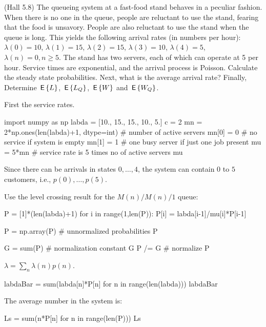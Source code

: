 \begin{exercise}
  (Hall 5.8) The queueing system at a fast-food stand behaves in a
  peculiar fashion. When there is no one in the queue, people are
  reluctant to use the stand, fearing that the food is
  unsavory. People are also reluctant to use the stand when the queue
  is long. This yields the following arrival rates (in numbers per hour): $\lambda(0) = 10$, $\lambda(1)=15$, $\lambda(2)=15$, $\lambda(3)=10$, $\lambda(4)=5$, $\lambda(n)=0, n\geq 5$. The stand has two servers, each of which can operate at 5 per hour. Service times are exponential, and the arrival process is Poisson.
 Calculate the steady state probabilities. Next,  what is the average arrival rate? Finally,
 Determine $\,\mathsf{E}\left\{L\right\}$, $\,\mathsf{E}\left\{L_Q\right\}$, $\,\mathsf{E}\left\{W\right\}$ and $\,\mathsf{E}\left\{W_Q\right\}$.
  \begin{solution}
First the service rates.
\begin{pyconsole}
import numpy as np
labda = [10., 15., 15., 10., 5.]
c = 2
mn = 2*np.ones(len(labda)+1, dtype=int)  # number of active servers
mn[0] = 0  # no service if system is empty
mn[1] = 1  # one busy server if just one job present
mu = 5*mn # service rate is 5 times no of active servers
mu
\end{pyconsole}

Since there can be arrivals in states $0,\ldots, 4$,  the system can contain $0$ to $5$ customers, i.e., $p(0),\ldots, p(5)$.

Use the level crossing result for the $M(n)/M(n)/1$ queue:

\begin{pyconsole}
P = [1]*(len(labda)+1)
for i in range(1,len(P)):
    P[i] = labda[i-1]/mu[i]*P[i-1]

P = np.array(P) # unnormalized probabilities
P
\end{pyconsole}

\begin{pyconsole}
G = sum(P) # normalization constant
G
P /= G # normalize
P 
\end{pyconsole} 

$\lambda = \sum_{n}\lambda(n) p(n)$.

\begin{pyconsole}
labdaBar = sum(labda[n]*P[n] for n in range(len(labda)))
labdaBar
\end{pyconsole}


The average number in the system is: 

\begin{pyconsole}
Ls = sum(n*P[n] for n in range(len(P)))
Ls
\end{pyconsole}



\end{solution}
\end{exercise}
